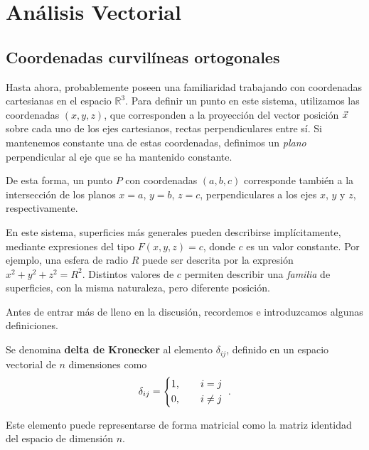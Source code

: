 \chapter{Análisis Vectorial}

\section{Coordenadas curvilíneas ortogonales}

Hasta ahora, probablemente poseen una familiaridad trabajando con coordenadas cartesianas en el espacio $\mathbb{R}^3$. Para definir un punto en este sistema, utilizamos las coordenadas $(x,y,z)$, que corresponden a la proyección del vector posición $\vec{x}$ sobre cada uno de los ejes cartesianos, rectas perpendiculares entre sí. Si mantenemos constante una de estas coordenadas, definimos un \emph{plano} perpendicular al eje que se ha mantenido constante. 

De esta forma, un punto $P$ con coordenadas $(a,b,c)$ corresponde también a la intersección de los planos $x=a$, $y=b$, $z=c$, perpendiculares a los ejes $x$, $y$ y $z$, respectivamente.

En este sistema, superficies más generales pueden describirse implícitamente, mediante expresiones del tipo $F(x,y,z) = c$, donde $c$ es un valor constante. Por ejemplo, una esfera de radio $R$ puede ser descrita por la expresión $x^2+y^2+z^2 = R^2$. Distintos valores de $c$ permiten describir una \emph{familia} de superficies, con la misma naturaleza, pero diferente posición.

Antes de entrar más de lleno en la discusión, recordemos e introduzcamos algunas definiciones.

\begin{defi} 
    Se denomina \textbf{delta de Kronecker} al elemento $\delta_{ij}$, definido en un espacio vectorial de $n$ dimensiones como
    \begin{equation}
        \delta_{ij} = \begin{dcases}
            1, \qquad i = j \\
            0, \qquad i \neq j
        \end{dcases} \ .
    \end{equation} 

    Este elemento puede representarse de forma matricial como la matriz identidad del espacio de dimensión $n$.
\end{defi}

\newpage

